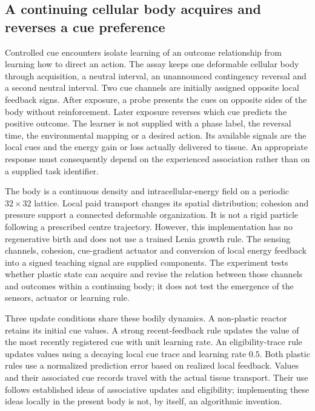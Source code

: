 

\subsection*{A continuing cellular body acquires and reverses a cue preference}

Controlled cue encounters isolate learning of an outcome relationship from learning how to direct an action. The assay keeps one deformable cellular body through acquisition, a neutral interval, an unannounced contingency reversal and a second neutral interval. Two cue channels are initially assigned opposite local feedback signs. After exposure, a probe presents the cues on opposite sides of the body without reinforcement. Later exposure reverses which cue predicts the positive outcome. The learner is not supplied with a phase label, the reversal time, the environmental mapping or a desired action. Its available signals are the local cues and the energy gain or loss actually delivered to tissue. An appropriate response must consequently depend on the experienced association rather than on a supplied task identifier.

The body is a continuous density and intracellular-energy field on a periodic $32\times32$ lattice. Local paid transport changes its spatial distribution; cohesion and pressure support a connected deformable organization. It is not a rigid particle following a prescribed centre trajectory. However, this implementation has no regenerative birth and does not use a trained Lenia growth rule. The sensing channels, cohesion, cue-gradient actuator and conversion of local energy feedback into a signed teaching signal are supplied components. The experiment tests whether plastic state can acquire and revise the relation between those channels and outcomes within a continuing body; it does not test the emergence of the sensors, actuator or learning rule.

Three update conditions share these bodily dynamics. A non-plastic reactor retains its initial cue values. A strong recent-feedback rule updates the value of the most recently registered cue with unit learning rate. An eligibility-trace rule updates values using a decaying local cue trace and learning rate $0.5$. Both plastic rules use a normalized prediction error based on realized local feedback. Values and their associated cue records travel with the actual tissue transport. Their use follows established ideas of associative updates and eligibility\cite{sutton,florian,izhikevich,fremaux}; implementing these ideas locally in the present body is not, by itself, an algorithmic invention.


